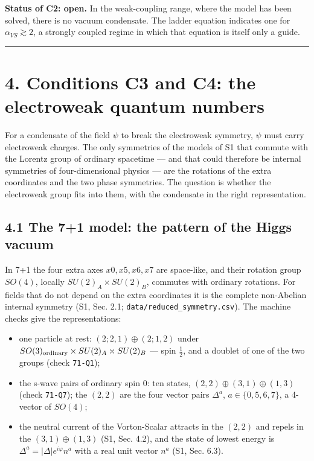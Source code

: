 \documentclass[
  10pt,
]{article}
\providecommand{\tightlist}{%
  \setlength{\itemsep}{0pt}\setlength{\parskip}{0pt}}
\begin{document}
\textbf{Status of C2: open.} In the weak-coupling range, where the model
has been solved, there is no vacuum condensate. The ladder equation
indicates one for \(\alpha_{VS}\gtrsim2\), a strongly coupled regime in
which that equation is itself only a guide.

\begin{center}\rule{0.5\linewidth}{0.5pt}\end{center}

\hypertarget{conditions-c3-and-c4-the-electroweak-quantum-numbers}{%
\section{4. Conditions C3 and C4: the electroweak quantum
numbers}\label{conditions-c3-and-c4-the-electroweak-quantum-numbers}}

For a condensate of the field \(\psi\) to break the electroweak
symmetry, \(\psi\) must carry electroweak charges. The only symmetries
of the models of S1 that commute with the Lorentz group of ordinary
spacetime --- and that could therefore be internal symmetries of
four-dimensional physics --- are the rotations of the extra coordinates
and the two phase symmetries. The question is whether the electroweak
group fits into them, with the condensate in the right representation.

\hypertarget{the-71-model-the-pattern-of-the-higgs-vacuum}{%
\subsection{4.1 The 7+1 model: the pattern of the Higgs
vacuum}\label{the-71-model-the-pattern-of-the-higgs-vacuum}}

In 7+1 the four extra axes \(x0,x5,x6,x7\) are space-like, and their
rotation group \(SO(4)\), locally \(SU(2)_A\times SU(2)_B\), commutes
with ordinary rotations. For fields that do not depend on the extra
coordinates it is the complete non-Abelian internal symmetry (S1, Sec.
2.1; \texttt{data/reduced\_symmetry.csv}). The machine checks give the
representations:

\begin{itemize}
\tightlist
\item
  one particle at rest: \((2;2,1)\oplus(2;1,2)\) under
  \(SO(3)_{\rm ordinary}\times SU(2)_A\times SU(2)_B\) --- spin
  \(\tfrac12\), and a doublet of one of the two groups (check
  \texttt{71-Q1});
\item
  the s-wave pairs of ordinary spin 0: ten states,
  \((2,2)\oplus(3,1)\oplus(1,3)\) (check \texttt{71-Q7}); the \((2,2)\)
  are the four vector pairs \(\Delta^a\), \(a\in\{0,5,6,7\}\), a
  4-vector of \(SO(4)\);
\item
  the neutral current of the Vorton-Scalar attracts in the \((2,2)\) and
  repels in the \((3,1)\oplus(1,3)\) (S1, Sec. 4.2), and the state of
  lowest energy is \(\Delta^a=|\Delta|e^{i\varphi}n^a\) with a real unit
  vector \(n^a\) (S1, Sec. 6.3).
\end{itemize}
\end{document}
